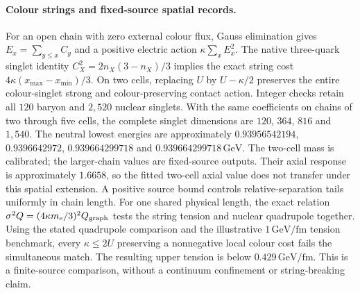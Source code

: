 \paragraph{Colour strings and fixed-source spatial records.}
For an open chain with zero external colour flux, Gauss elimination gives
$E_x=\sum_{y\leq x}C_y$ and a positive electric action
$\kappa\sum_x E_x^2$. The native three-quark singlet identity
$C_X^2=2n_X(3-n_X)/3$ implies the exact string cost
$4\kappa(x_{\max}-x_{\min})/3$.
On two cells, replacing $U$ by $U-\kappa/2$ preserves the entire
colour-singlet strong and colour-preserving contact action. Integer
checks retain all $120$ baryon and $2{,}520$ nuclear singlets.
With the same coefficients on chains of two through five cells, the
complete singlet dimensions are $120$, $364$, $816$ and $1{,}540$.
The neutral lowest energies are approximately
$0.93956542194$, $0.9396642972$, $0.939664299718$ and
$0.939664299718\,\mathrm{GeV}$. The two-cell mass is calibrated;
the larger-chain values are fixed-source outputs. Their axial response
is approximately $1.6658$, so the fitted two-cell axial value does not
transfer under this spatial extension. A positive source bound controls
relative-separation tails uniformly in chain length.
For one shared physical length, the exact relation
$\sigma^2Q=(4\kappa m_e/3)^2Q_{\rm graph}$ tests the string tension
and nuclear quadrupole together. Using the stated quadrupole comparison
and the illustrative $1\,\mathrm{GeV/fm}$ tension benchmark, every
$\kappa\leq2U$ preserving a nonnegative local colour cost fails the
simultaneous match. The resulting upper tension is below
$0.429\,\mathrm{GeV/fm}$. This is a finite-source comparison, without
a continuum confinement or string-breaking claim.
